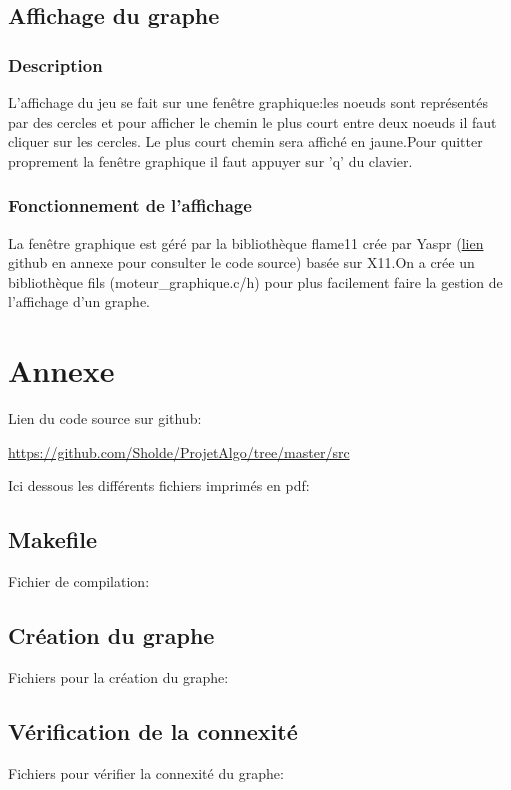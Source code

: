 \documentclass[a4paper,11pt]{report}
\begin{document}
\section{Affichage du graphe}
\subsection{Description}
L'affichage du jeu se fait sur une fenêtre graphique:les noeuds sont représentés par des cercles et pour afficher le chemin le plus court entre deux noeuds il faut cliquer sur les cercles. Le plus court chemin sera affiché en jaune.Pour quitter proprement la fenêtre graphique il faut appuyer sur 'q' du clavier.
\subsection{Fonctionnement de l'affichage}
La fenêtre graphique est géré par la bibliothèque flame11 crée par Yaspr (\href{https://github.com/yaspr/flame11}{lien} github en annexe pour consulter le code source) basée sur X11.On a crée un bibliothèque fils (moteur\_graphique.c/h) pour plus facilement faire la gestion de l'affichage d'un graphe. 

\chapter{Annexe}
Lien du code source sur github:
\begin{center}
    \url{https://github.com/Sholde/ProjetAlgo/tree/master/src}
\end{center}
Ici dessous les différents fichiers imprimés en pdf:

\section{Makefile}
Fichier de compilation:


\section{Création du graphe}
Fichiers pour la création du graphe:



\section{Vérification de la connexité}
Fichiers pour vérifier la connexité du graphe:


\end{document}

